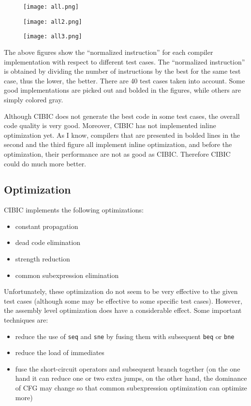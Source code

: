 \documentclass[10pt, a4paper]{article}
\begin{document}
\begin{figure}[H]
    \centering
    \texttt{[image: all.png]}
\end{figure}
\begin{figure}[H]
    \centering
    \texttt{[image: all2.png]}
\end{figure}
\begin{figure}[H]
    \centering
    \texttt{[image: all3.png]}
\end{figure}

The above figures show the ``normalized instruction'' for each compiler
implementation with respect to different test cases. The ``normalized
instruction'' is obtained by dividing the number of instructions by the best
for the same test case, thus the lower, the better. There are 40 test cases
taken into account. Some good implementations are picked out and bolded in the
figures, while others are simply colored gray.

Although CIBIC does not generate the best code in some test cases, the overall
code quality is very good. Moreover, CIBIC has not implemented inline
optimization yet. As I know, compilers that are presented in bolded lines in
the second and the third figure all implement inline optimization, and before
the optimization, their performance are not as good as CIBIC. Therefore CIBIC
could do much more better.

\subsection{Optimization}
CIBIC implements the following optimizations: 
\begin{itemize}
    \item constant propagation
    \item dead code elimination
    \item strength reduction
    \item common subexpression elimination
\end{itemize}

Unfortunately, these optimization do not seem to be very effective to the
given test cases (although some may be effective to some specific test cases).
However, the assembly level optimization does have a considerable effect. Some
important techniques are:
\begin{itemize}
    \item reduce the use of \texttt{seq} and \texttt{sne} by fusing them with
        subsequent \texttt{beq} or \texttt{bne}
    \item reduce the load of immediates
    \item fuse the short-circuit operators and subsequent branch together (on
        the one hand it can reduce one or two extra jumps, on the other hand,
        the dominance of CFG may change so that common subexpression
        optimization can optimize more)
\end{itemize}
\end{document}
